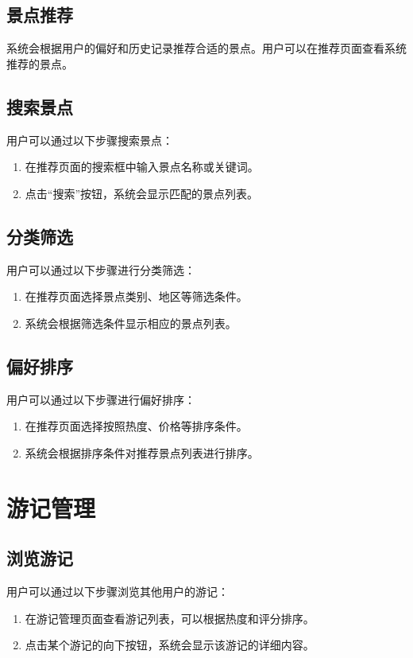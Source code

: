 \documentclass{ctexart}
\begin{document}
\subsection{景点推荐}
系统会根据用户的偏好和历史记录推荐合适的景点。用户可以在推荐页面查看系统推荐的景点。

\subsection{搜索景点}
用户可以通过以下步骤搜索景点：
\begin{enumerate}
    \item 在推荐页面的搜索框中输入景点名称或关键词。
    \item 点击“搜索”按钮，系统会显示匹配的景点列表。
\end{enumerate}

\subsection{分类筛选}
用户可以通过以下步骤进行分类筛选：
\begin{enumerate}
    \item 在推荐页面选择景点类别、地区等筛选条件。
    \item 系统会根据筛选条件显示相应的景点列表。
\end{enumerate}

\subsection{偏好排序}
用户可以通过以下步骤进行偏好排序：
\begin{enumerate}
    \item 在推荐页面选择按照热度、价格等排序条件。
    \item 系统会根据排序条件对推荐景点列表进行排序。
\end{enumerate}

\section{游记管理}

\subsection{浏览游记}
用户可以通过以下步骤浏览其他用户的游记：
\begin{enumerate}
    \item 在游记管理页面查看游记列表，可以根据热度和评分排序。
    \item 点击某个游记的向下按钮，系统会显示该游记的详细内容。
\end{enumerate}
\end{document}
